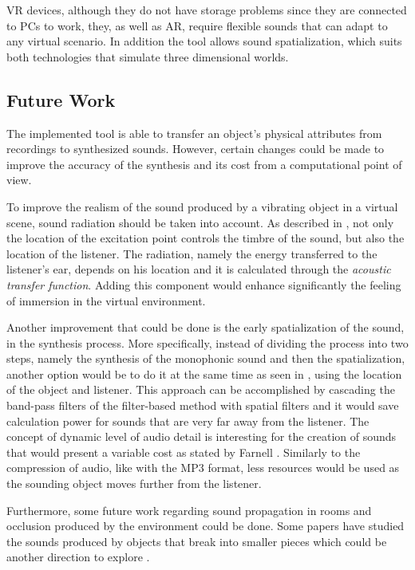 \gls{VR} devices, although they do not have storage problems since they are connected to PCs to work, they, as well as \gls{AR}, require flexible sounds that can adapt to any virtual scenario. In addition the tool allows sound spatialization, which suits both technologies that simulate three dimensional worlds.

\subsection{Future Work}


The implemented tool is able to transfer an object's physical attributes from recordings to synthesized sounds. However, certain changes could be made to improve the accuracy of the synthesis and its cost from a computational point of view.

To improve the realism of the sound produced by a vibrating object in a virtual scene, sound radiation should be taken into account. As described in \cite{corbett2007timbrefields}, not only the location of the excitation point controls the timbre of the sound, but also the location of the listener. The radiation, namely the energy transferred to the listener's ear, depends on his location and it is calculated through the \textit{acoustic transfer function}. Adding this component would enhance significantly the feeling of immersion in the virtual environment.

Another improvement that could be done is the early spatialization of the sound, in the synthesis process. More specifically, instead of dividing the process into two steps, namely the synthesis of the monophonic sound and then the spatialization, another option would be to do it at the same time as seen in \cite{verron2010synthese}, using the location of the object and listener. This approach can be accomplished by cascading the band-pass filters of the filter-based method with spatial filters and it would save calculation power for sounds that are very far away from the listener. The concept of dynamic level of audio detail is interesting for the creation of sounds that would present a variable cost as stated by Farnell \cite{farnell2010designing}. Similarly to the compression of audio, like with the MP3 format, less resources would be used as the sounding object moves further from the listener. 

Furthermore, some future work regarding sound propagation in rooms and occlusion produced by the environment could be done. Some papers have studied the sounds produced by objects that break into smaller pieces which could be another direction to explore \cite{zheng2010rigid}.
